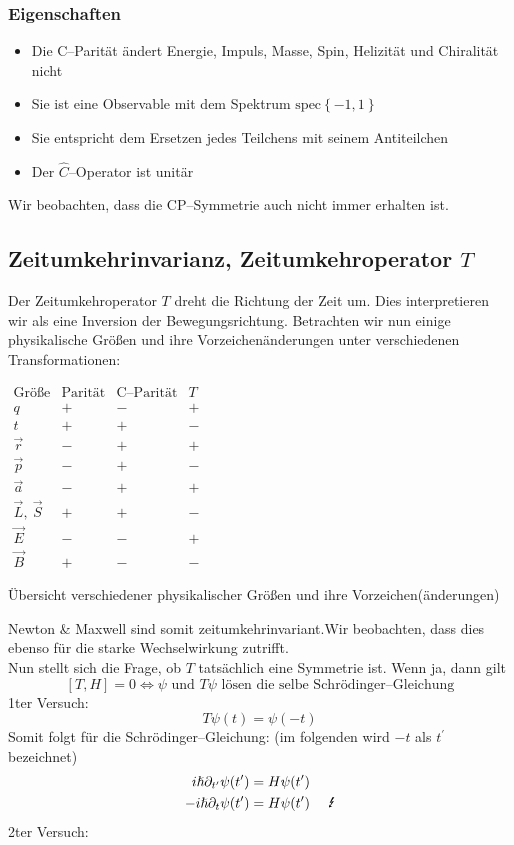 \documentclass[Ex4_Zusammenfassung.tex]{subfiles}
\begin{document}
\subsubsection{Eigenschaften}
\begin{itemize}
	\item Die C--Parität ändert Energie, Impuls, Masse, Spin, Helizität und Chiralität nicht
	\item Sie ist eine Observable mit dem Spektrum $\mathrm{spec}\left\{ -1, 1\right\}$
	\item Sie entspricht dem Ersetzen jedes Teilchens mit seinem Antiteilchen
	\item Der $\hat{C}$--Operator ist unitär
\end{itemize}
Wir beobachten, dass die CP--Symmetrie auch nicht immer erhalten ist. 

\subsection{Zeitumkehrinvarianz, Zeitumkehroperator $T$}
Der Zeitumkehroperator $T$ dreht die Richtung der Zeit um. Dies interpretieren wir als eine Inversion der Bewegungsrichtung. Betrachten wir nun einige physikalische Größen und ihre Vorzeichenänderungen unter verschiedenen Transformationen:
\begin{table}[H]
	\centering
	$
	\begin{array}{cccc}
	\text{Größe} & \text{Parität} & \text{C--Parität} & T \\ \hline
	q & + & - & + \\ 
	t & + & + & - \\ 
	\vec{r} & - & + & + \\ 
	\vec{p} & - & + & - \\ 
	\vec{a} & - & + & + \\ 
	\vec{L},\ \vec{S} & + & + & - \\ 
	\vec{E} & - & - & + \\ 
	\vec{B} & + & - & -
	\end{array}  
	$
	\caption{Übersicht verschiedener physikalischer Größen und ihre Vorzeichen(änderungen)}
\end{table}
Newton \& Maxwell sind somit zeitumkehrinvariant.Wir beobachten, dass dies ebenso für die starke Wechselwirkung zutrifft.\\

Nun stellt sich die Frage, ob $T$ tatsächlich eine Symmetrie ist. Wenn ja, dann gilt
\begin{equation}
	\left[ T,H\right] =0 \Leftrightarrow \psi \text{ und } T \psi \text{ lösen die selbe Schrödinger--Gleichung}
\end{equation}
1ter Versuch: 
\begin{equation}
	T\psi(t) = \psi(-t)
\end{equation}
Somit folgt für die Schrödinger--Gleichung: (im folgenden wird $-t$ als $t^\prime$ bezeichnet)
\begin{align}
	i \hslash \partial_{t^\prime} \psi(t^\prime) &= H\psi(t^\prime)\\
	-i \hslash \partial_t \psi(t^\prime) &= H\psi(t^\prime)\ \quad \text{\Lightning}
\end{align}
2ter Versuch: 
\end{document}
